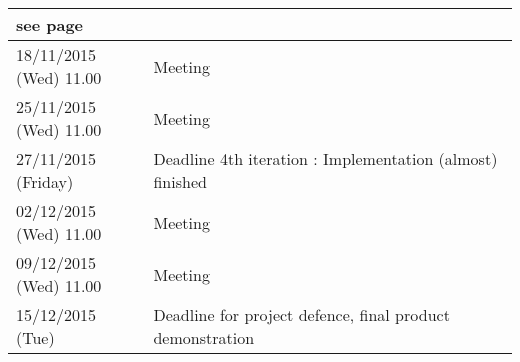 \begin{longtable}{|p{0.275\linewidth}|p{0.725\linewidth}|}
    see page~\pageref{shouldhave}\\
    \hline
    18/11/2015 (Wed) 11.00 & Meeting \\
    \hline
    25/11/2015 (Wed) 11.00 & Meeting \\
    \hline
    27/11/2015 (Friday) & Deadline 4th iteration : Implementation (almost)
    finished \\
    \hline
    02/12/2015 (Wed) 11.00 & Meeting \\
    \hline
    09/12/2015 (Wed) 11.00 & Meeting \\
    \hline
    15/12/2015 (Tue) & Deadline for project defence, final product
    demonstration \\
    \hline
\end{longtable}
